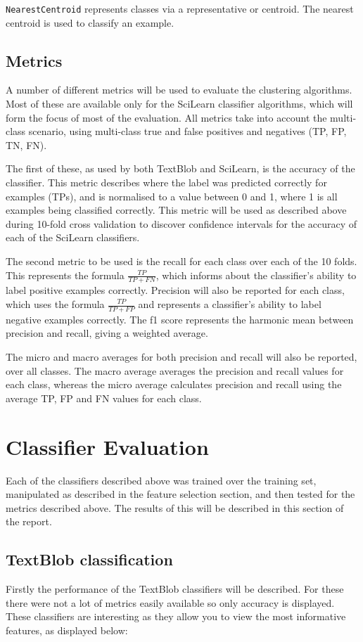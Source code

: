 \documentclass{article}
\begin{document}
\verb|NearestCentroid| represents classes via a representative or centroid.  The nearest centroid is used to classify an example.

\subsection{Metrics}
A number of different metrics will be used to evaluate the clustering algorithms. Most of these are available only for the SciLearn classifier algorithms, which will form the focus of most of the evaluation. All metrics take into account the multi-class scenario, using multi-class true and false positives and negatives (TP, FP, TN, FN).

The first of these, as used by both TextBlob and SciLearn, is the accuracy of the classifier. This metric describes where the label was predicted correctly for examples (TPs), and is normalised to a value between 0 and 1, where 1 is all examples being classified correctly. This metric will be used as described above during 10-fold cross validation to discover confidence intervals for the accuracy of each of the SciLearn classifiers.

The second metric to be used is the recall for each class over each of the 10 folds. This represents the formula $\frac{TP}{TP+FN}$, which informs about the classifier's ability to label positive examples correctly. Precision will also be reported for each class, which uses the formula $\frac{TP}{TP+FP}$ and represents a classifier's ability to label negative examples correctly. The f1 score represents the harmonic mean between precision and recall, giving a weighted average. 

The micro and macro averages for both precision and recall will also be reported, over all classes. The macro average averages the precision and recall values for each class, whereas the micro average calculates precision and recall using the average TP, FP and FN values for each class.

\section{Classifier Evaluation}
Each of the classifiers described above was trained over the training set, manipulated as described in the feature selection section, and then tested for the metrics described above. The results of this will be described in this section of the report.

\subsection{TextBlob classification}
Firstly the performance of the TextBlob classifiers will be described. For these there were not a lot of metrics easily available so only accuracy is displayed. These classifiers are interesting as they allow you to view the most informative features, as displayed below:
\end{document}

